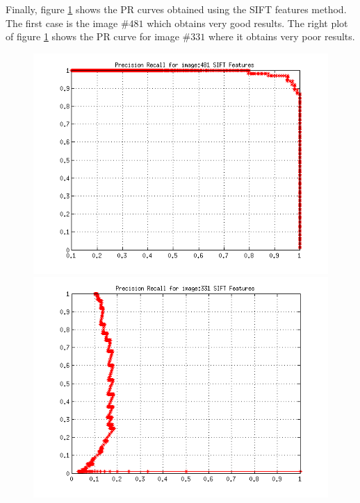 \documentclass[a4paper,12pt]{article}
\begin{document}
Finally, figure \ref{fig:sgb} shows the PR curves obtained using the SIFT features method.
The first case is the image $\#481$ which obtains very good results. 
The right plot of figure \ref{fig:sgb} shows the PR curve for image $\#331$ where it obtains very poor results.
\begin{figure}[h!]
    \centering
    \includegraphics[totalheight=.24\textheight]{../Results/PR/GoodSIFT.png}
    \includegraphics[totalheight=.24\textheight]{../Results/PR/BadSIFT.png}
    \label{fig:sgb}
\end{figure}


\end{document}

